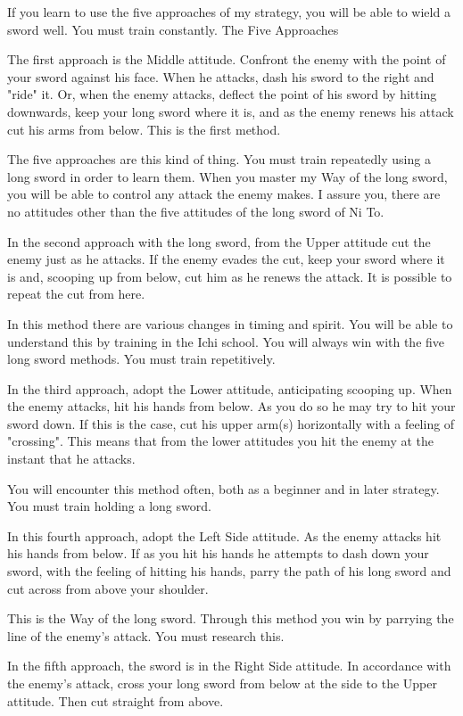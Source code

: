 If you learn to use the five approaches of my strategy, you will be able to wield a sword well. You must train constantly.
The Five Approaches

    The first approach is the Middle attitude. Confront the enemy with the point of your sword against his face. When he attacks, dash his sword to the right and "ride" it. Or, when the enemy attacks, deflect the point of his sword by hitting downwards, keep your long sword where it is, and as the enemy renews his attack cut his arms from below. This is the first method. 

The five approaches are this kind of thing. You must train repeatedly using a long sword in order to learn them. When you master my Way of the long sword, you will be able to control any attack the enemy makes. I assure you, there are no attitudes other than the five attitudes of the long sword of Ni To.

    In the second approach with the long sword, from the Upper attitude cut the enemy just as he attacks. If the enemy evades the cut, keep your sword where it is and, scooping up from below, cut him as he renews the attack. It is possible to repeat the cut from here. 

In this method there are various changes in timing and spirit. You will be able to understand this by training in the Ichi school. You will always win with the five long sword methods. You must train repetitively.

    In the third approach, adopt the Lower attitude, anticipating scooping up. When the enemy attacks, hit his hands from below. As you do so he may try to hit your sword down. If this is the case, cut his upper arm(s) horizontally with a feeling of "crossing". This means that from the lower attitudes you hit the enemy at the instant that he attacks. 

You will encounter this method often, both as a beginner and in later strategy. You must train holding a long sword.

    In this fourth approach, adopt the Left Side attitude. As the enemy attacks hit his hands from below. If as you hit his hands he attempts to dash down your sword, with the feeling of hitting his hands, parry the path of his long sword and cut across from above your shoulder. 

This is the Way of the long sword. Through this method you win by parrying the line of the enemy's attack. You must research this.

    In the fifth approach, the sword is in the Right Side attitude. In accordance with the enemy's attack, cross your long sword from below at the side to the Upper attitude. Then cut straight from above. 

